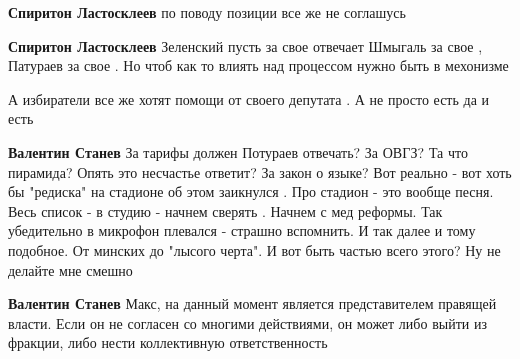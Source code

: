 \begin{itemize}
\begin{itemize}
 
\textbf{Спиритон Ластосклеев} по поводу позиции все же не соглашусь

 
\textbf{Спиритон Ластосклеев} Зеленский пусть за свое отвечает Шмыгаль за свое , Патураев за свое . Но чтоб как то влиять над процессом нужно быть в мехонизме

 
А избиратели все же хотят помощи от своего депутата . А не просто есть да и есть

 
\textbf{Валентин Станев} За тарифы должен Потураев отвечать? За ОВГЗ? Та что пирамида? Опять это несчастье ответит? За закон о языке? Вот реально - вот хоть бы "редиска" на стадионе об этом заикнулся \Smiley[1.0][yellow] . Про стадион - это вообще песня. Весь список - в студию - начнем сверять \Smiley[1.0][yellow] . Начнем с мед реформы. Так убедительно в микрофон плевался - страшно вспомнить. И так далее и тому подобное. От минских до "лысого черта". И вот быть частью всего этого? Ну не делайте мне смешно \Smiley[1.0][yellow]

 
\textbf{Валентин Станев} Макс, на данный момент является представителем правящей
власти. Если он не согласен со многими действиями, он может либо выйти из
фракции, либо нести коллективную ответственность


\end{itemize}
\end{itemize}
